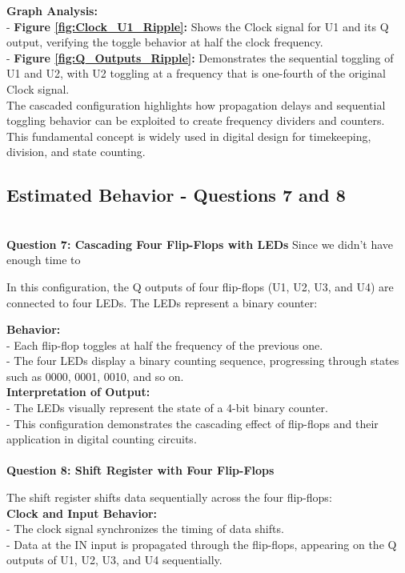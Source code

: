 \documentclass{article}
\begin{document}
    \textbf{Graph Analysis:} \\
    - \textbf{Figure \ref{fig:Clock_U1_Ripple}:} Shows the Clock signal for U1 and its Q output, verifying the toggle behavior at half the clock frequency. \\
    - \textbf{Figure \ref{fig:Q_Outputs_Ripple}:} Demonstrates the sequential toggling of U1 and U2, with U2 toggling at a frequency that is one-fourth of the original Clock signal. \\

    The cascaded configuration highlights how propagation delays and sequential toggling behavior can be exploited to create frequency dividers and counters. This fundamental concept is widely used in digital design for timekeeping, division, and state counting.

    \subsection*{\textbf{Estimated Behavior - Questions 7 and 8}}
    \\
    \textbf{Question 7: Cascading Four Flip-Flops with LEDs}
    Since we didn't have enough time to 

    In this configuration, the Q outputs of four flip-flops (U1, U2, U3, and U4) are connected to four LEDs. The LEDs represent a binary counter:

    \textbf{Behavior:} \\
    - Each flip-flop toggles at half the frequency of the previous one. \\
    - The four LEDs display a binary counting sequence, progressing through states such as 0000, 0001, 0010, and so on. \\

    \textbf{Interpretation of Output:} \\
    - The LEDs visually represent the state of a 4-bit binary counter. \\
    - This configuration demonstrates the cascading effect of flip-flops and their application in digital counting circuits. \\

    \\
    \textbf{Question 8: Shift Register with Four Flip-Flops}

    The shift register shifts data sequentially across the four flip-flops: \\ 

    \textbf{Clock and Input Behavior:} \\ 
    - The clock signal synchronizes the timing of data shifts. \\ 
    - Data at the IN input is propagated through the flip-flops, appearing on the Q outputs of U1, U2, U3, and U4 sequentially. \\
\end{document}
